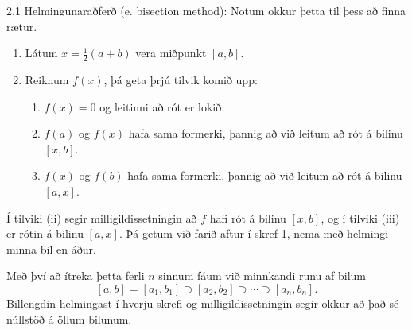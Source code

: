 \begin{frame}{2.1 Helmingunaraðferð (e. bisection method):} 
Notum okkur þetta til þess að finna rætur.\pause

\begin{enumerate}
	\item[(1)] Látum $x = \frac12 (a+b)$ vera miðpunkt $[a,b]$.\pause
	\item [(2)]Reiknum $f(x)$, þá geta þrjú tilvik komið upp:
	\vspace{0.55\baselineskip}
	\begin{enumerate}
		\item[(i)] $f(x) = 0$ og leitinni að rót er lokið.\pause
		\item[(ii)] $f(a)$ og $f(x)$ hafa sama formerki, þannig að við
leitum að rót á bilinu $[x,b]$.\pause
		\item[(iii)] $f(x)$ og $f(b)$ hafa sama formerki, þannig að 
við leitum að rót á bilinu $[a,x]$.
	\end{enumerate}
	\vspace{0.85\baselineskip}
\end{enumerate}  \pause

Í tilviki (ii) segir milligildissetningin að $f$ hafi rót á bilinu
$[x,b]$, og í tilviki (iii) er rótin á bilinu $[a,x]$. Þá getum við
farið aftur í skref 1, nema með helmingi minna bil en áður. 
\pause

\smallskip
Með því að ítreka þetta ferli $n$ sinnum fáum við minnkandi runu af
bilum 
$$
[a,b]=[a_1,b_1]\supset [a_2,b_2]\supset \cdots\supset [a_n,b_n].
$$
Billengdin helmingast í hverju skrefi og milligildissetningin segir
okkur að það sé núllstöð á öllum bilunum.
\end{frame}
%
